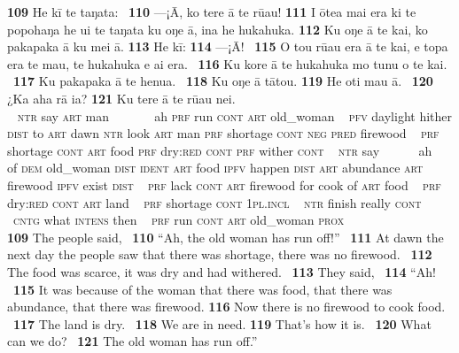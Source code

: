 \largerpage
\medskip\gll
\textbf{\textup{109}} He kī te taŋata: ~\textbf{\textup{110}} —¡{\ꞌ}\=A, ko tere {\ꞌ}ā te rū{\ꞌ}au! \textbf{\textup{111}} I {\ꞌ}ōtea mai era ki te popohaŋa he u{\ꞌ}i te taŋata ku oŋe {\ꞌ}ā, {\ꞌ}ina he hukahuka. \textbf{\textup{112}} Ku oŋe {\ꞌ}ā te kai, ko pakapaka {\ꞌ}ā ku mei {\ꞌ}ā. \textbf{\textup{113}} He kī: \textbf{\textup{114}} —¡{\ꞌ}\=A! ~\textbf{\textup{115}} O tou rū{\ꞌ}au era {\ꞌ}ā te kai, e topa era te mau, te hukahuka e ai era. ~\textbf{\textup{116}} Ku kore {\ꞌ}ā te hukahuka mo tunu o te kai. ~\textbf{\textup{117}} Ku pakapaka {\ꞌ}ā te henua. ~\textbf{\textup{118}} Ku oŋe {\ꞌ}ā tātou. \textbf{\textup{119}} He oti mau {\ꞌ}ā. ~\textbf{\textup{120}} ¿Ka aha rā ia? \textbf{\textup{121}} Ku tere {\ꞌ}ā te rū{\ꞌ}au nei.\\
~ \textsc{ntr} say \textsc{art} man ~ ~~~~~ah \textsc{prf} run \textsc{cont} \textsc{art} old\_woman  ~ \textsc{pfv} daylight hither \textsc{dist} to \textsc{art} dawn \textsc{ntr} look \textsc{art} man \textsc{prf} shortage \textsc{cont} \textsc{neg} \textsc{pred} firewood ~ \textsc{prf} shortage \textsc{cont} \textsc{art} food \textsc{prf} dry:\textsc{red} \textsc{cont} \textsc{prf} wither \textsc{cont}  ~ \textsc{ntr} say ~ ~~~~ah ~ of \textsc{dem} old\_woman \textsc{dist} \textsc{ident} \textsc{art} food \textsc{ipfv} happen \textsc{dist} \textsc{art} abundance \textsc{art} firewood \textsc{ipfv} exist \textsc{dist} ~ \textsc{prf} lack \textsc{cont} \textsc{art} firewood for cook of \textsc{art} food ~ \textsc{prf} dry:\textsc{red} \textsc{cont} \textsc{art} land ~ \textsc{prf} shortage \textsc{cont} \textsc{1pl.incl}  ~ \textsc{ntr} finish really \textsc{cont} ~ ~\textsc{cntg} what \textsc{intens} then  ~ \textsc{prf} run \textsc{cont} \textsc{art} old\_woman \textsc{prox}\\

\medskip\glt
\textbf{\textup{109}} The people said, ~\textbf{\textup{110}} “Ah, the old woman has run off!” ~\textbf{\textup{111}} At dawn the next day the people saw that there was shortage, there was no firewood. ~\textbf{\textup{112}} The food was scarce, it was dry and had withered. ~\textbf{\textup{113}} They said, ~\textbf{\textup{114}} “Ah! ~\textbf{\textup{115}} It was because of the woman that there was food, that there was abundance, that there was firewood. \textbf{\textup{116}} Now there is no firewood to cook food. ~\textbf{\textup{117}} The land is dry. ~\textbf{\textup{118}} We are in need. \textbf{\textup{119}} That’s how it is. ~\textbf{\textup{120}} What can we do? ~\textbf{\textup{121}} The old woman has run off.”


